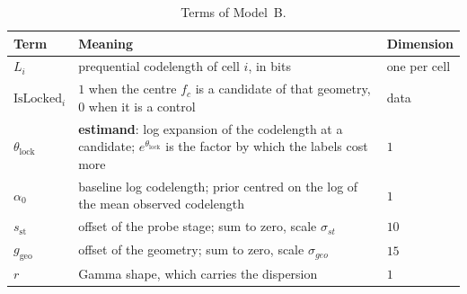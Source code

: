 \begin{table}[!tbp]
    \centering
    \small
    \setlength{\tabcolsep}{4pt}
    \renewcommand{\arraystretch}{1.2}
    \begin{tabular}{@{}lM{9.6cm}l@{}}
        \toprule
        \textbf{Term} & \textbf{Meaning} & \textbf{Dimension} \\
        \midrule
        $L_i$ & prequential codelength of cell $i$, in bits & one per cell \\
        \rowsep%
        $\mathrm{IsLocked}_i$ & $1$ when the centre $f_c$ is a candidate of that geometry, $0$ when it is a control & data \\
        \rowsep%
        $\theta_{\mathrm{lock}}$ & \textbf{estimand}: log expansion of the codelength at a candidate; $e^{\theta_{\mathrm{lock}}}$ is the factor by which the labels cost more & $1$ \\
        \midrule
        $\alpha_0$ & baseline log codelength; prior centred on the log of the mean observed codelength & $1$ \\
        \rowsep%
        $s_{\text{st}}$ & offset of the probe stage; sum to zero, scale $\sigma_{st}$ & $10$ \\
        \rowsep%
        $g_{\text{geo}}$ & offset of the geometry; sum to zero, scale $\sigma_{geo}$ & $15$ \\
        \rowsep%
        $r$ & Gamma shape, which carries the dispersion & $1$ \\
        \bottomrule
    \end{tabular}
    \caption{Terms of Model~B.}%
    \label{tab:termsB}
\end{table}
